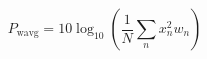 \documentclass{article}
\begin{document}
 
\[
P_{\mbox{wavg}} = 10 \log_{10} \left( \frac{1}{N}\sum_n x_n^2 w_n\right)
\]
 \newpage 
\end{document}
